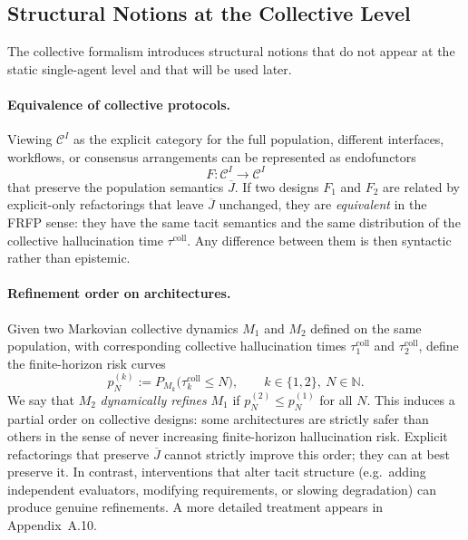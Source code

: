 \subsection{Structural Notions at the Collective Level}

The collective formalism introduces structural notions that do not appear at the static single-agent level and that will be used later.

\paragraph{Equivalence of collective protocols.}
Viewing $\mathcal{C}^I$ as the explicit category for the full population, different interfaces, workflows, or consensus arrangements can be represented as endofunctors
\[
  F : \mathcal{C}^I \longrightarrow \mathcal{C}^I
\]
that preserve the population semantics $\overline{J}$. If two designs $F_1$ and $F_2$ are related by explicit-only refactorings that leave $\overline{J}$ unchanged, they are \emph{equivalent} in the FRFP sense: they have the same tacit semantics and the same distribution of the collective hallucination time $\tau^{\mathrm{coll}}$. Any difference between them is then syntactic rather than epistemic.

\paragraph{Refinement order on architectures.}
Given two Markovian collective dynamics $M_1$ and $M_2$ defined on the same population, with corresponding collective hallucination times $\tau^{\mathrm{coll}}_1$ and $\tau^{\mathrm{coll}}_2$, define the finite-horizon risk curves
\[
  p_N^{(k)} := P_{M_k}\bigl(\tau^{\mathrm{coll}}_k \le N\bigr),
  \qquad k \in \{1,2\},\ N \in \mathbb{N}.
\]
We say that $M_2$ \emph{dynamically refines} $M_1$ if $p_N^{(2)} \le p_N^{(1)}$ for all $N$. This induces a partial order on collective designs: some architectures are strictly safer than others in the sense of never increasing finite-horizon hallucination risk. Explicit refactorings that preserve $\overline{J}$ cannot strictly improve this order; they can at best preserve it. In contrast, interventions that alter tacit structure (e.g.\ adding independent evaluators, modifying requirements, or slowing degradation) can produce genuine refinements. A more detailed treatment appears in Appendix~A.10.

